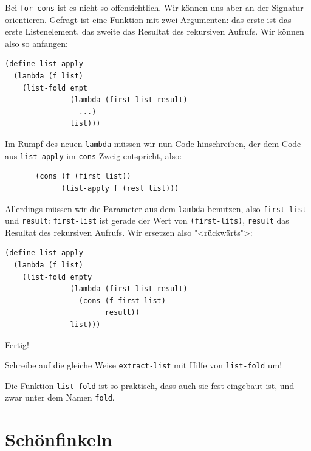 Bei \lstinline{for-cons} ist es nicht so offensichtlich.  Wir können
uns aber an der Signatur orientieren.  Gefragt ist eine Funktion mit
zwei Argumenten: das erste ist das erste Listenelement, das zweite das
Resultat des rekursiven Aufrufs.  Wir können also so anfangen:
%
\begin{lstlisting}
(define list-apply
  (lambda (f list)
    (list-fold empt
               (lambda (first-list result)
                 ...)
               list)))
\end{lstlisting}
%
Im Rumpf des neuen \lstinline{lambda} müssen wir nun Code
hinschreiben, der dem Code aus \lstinline{list-apply} im
\lstinline{cons}-Zweig entspricht, also:
%
\begin{lstlisting}
       (cons (f (first list))
             (list-apply f (rest list)))
\end{lstlisting}
%
Allerdings müssen wir die Parameter aus dem \lstinline{lambda}
benutzen, also \lstinline{first-list} und \lstinline{result}:
\lstinline{first-list} ist gerade der Wert von
\lstinline{(first-lits)}, \lstinline{result} das Resultat des
rekursiven Aufrufs.  Wir ersetzen also "<rückwärts">:
%
\begin{lstlisting}
(define list-apply
  (lambda (f list)
    (list-fold empty
               (lambda (first-list result)
                 (cons (f first-list)
                       result))
               list)))
\end{lstlisting}
%
Fertig!

\begin{aufgabeinline}
  Schreibe auf die gleiche Weise \lstinline{extract-list} mit Hilfe
  von \lstinline{list-fold} um!
\end{aufgabeinline}
%
Die Funktion \lstinline{list-fold} ist so praktisch, dass auch sie
fest eingebaut ist, und zwar unter dem Namen
\lstinline{fold}.

\section{Schönfinkeln}
\label{sec:currying}

